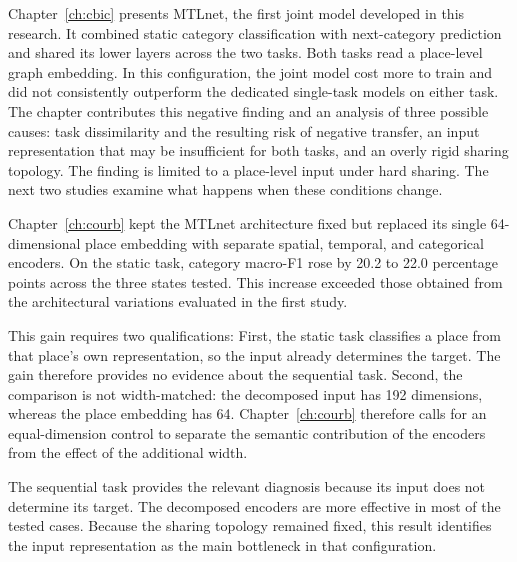 Chapter~\ref{ch:cbic} presents MTLnet, the first joint model developed in this research.
It combined static category classification with next-category prediction and shared its
lower layers across the two tasks. Both tasks read a place-level graph embedding. In
this configuration, the joint model cost more to train and did not consistently
outperform the dedicated single-task models on either task. The chapter contributes
this negative finding and an analysis of three possible causes: task dissimilarity and
the resulting risk of negative transfer, an input representation that may be
insufficient for both tasks, and an overly rigid sharing topology. The finding is
limited to a place-level input under hard sharing. The next two studies examine what
happens when these conditions change.

Chapter~\ref{ch:courb} kept the MTLnet architecture fixed but replaced its single
64-dimensional place embedding with separate spatial, temporal, and categorical
encoders. On the static task, category macro-F1 rose by 20.2 to 22.0 percentage points
across the three states tested. This increase exceeded those obtained from the
architectural variations evaluated in the first study.

This gain requires two qualifications: First, the static task classifies a place from
that place's own representation, so the input already determines the target. The gain
therefore provides no evidence about the sequential task. Second, the comparison is not
width-matched: the decomposed input has 192 dimensions, whereas the place embedding has
64. Chapter~\ref{ch:courb} therefore calls for an equal-dimension control to separate the
semantic contribution of the encoders from the effect of the additional width.

The sequential task provides the relevant diagnosis because its input does not
determine its target. The decomposed encoders are more effective in most of the tested
cases. Because the sharing topology remained fixed, this result identifies the input
representation as the main bottleneck in that configuration.

